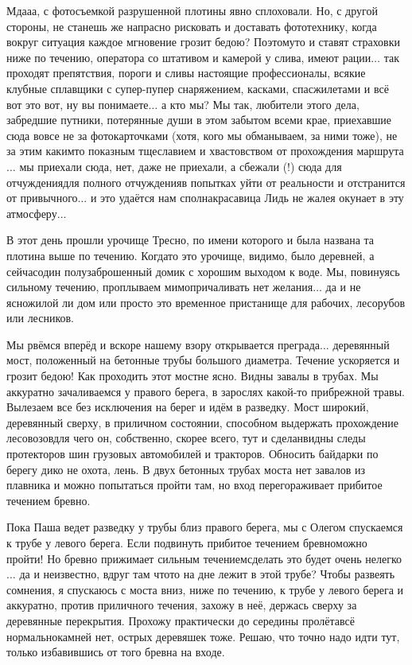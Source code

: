Мда\sdash а\sdash а, с фотосъемкой разрушенной плотины явно сплоховали. Но, с другой стороны, не станешь же напрасно рисковать и доставать фототехнику, когда вокруг ситуация каждое мгновение грозит бедою? Поэтому\sdash то и ставят страховки ниже по течению, оператора со штативом и камерой у слива, имеют рации$\ldots$ так проходят препятствия, пороги и сливы настоящие профессионалы, всякие клубные сплавщики с супер-пупер снаряжением, касками, спасжилетами и всё вот это вот, ну вы понимаете$\ldots$ а кто мы? Мы так, любители этого дела, забредшие путники, потерянные души в этом забытом всеми крае, приехавшие сюда вовсе не за фотокарточками (хотя, кого мы обманываем, за ними тоже), не за этим каким\sdash то показным тщеславием и хвастовством от прохождения маршрута$\ldots$ мы приехали сюда, нет, даже не приехали, а сбежали (!) сюда для отчуждения\mdash для полного отчуждения\mdash в попытках уйти от реальности и отстранится от привычного$\ldots$ и это удаётся нам сполна\mdash красавица Лидь не жалея окунает в эту атмосферу$\ldots$

В этот день прошли урочище Тресно, по имени которого и была названа та плотина выше по течению. Когда\sdash то это урочище, видимо, было деревней, а сейчас\mdash один полузаброшенный домик с хорошим выходом к воде. Мы, повинуясь сильному течению, проплываем мимо\mdash причаливать нет желания$\ldots$ да и не ясно\mdash жилой ли дом или просто это временное пристанище для рабочих, лесорубов или лесников.

Мы рвёмся вперёд и вскоре нашему взору открывается преграда$\ldots$ деревянный мост, положенный на бетонные трубы большого диаметра. Течение ускоряется и грозит бедою! Как проходить этот мост\mdash не ясно. Видны завалы в трубах. Мы аккуратно зачаливаемся у правого берега, в зарослях какой-то прибрежной травы. Вылезаем все без исключения на берег и идём в разведку. Мост широкий, деревянный сверху, в приличном состоянии, способном выдержать прохождение лесовозов\mdash для чего он, собственно, скорее всего, тут и сделан\mdash видны следы протекторов шин грузовых автомобилей и тракторов. Обносить байдарки по берегу дико не охота, лень. В двух бетонных трубах моста нет завалов из плавника и можно попытаться пройти там, но вход перегораживает прибитое течением бревно. 

Пока Паша ведет разведку у трубы близ правого берега, мы с Олегом спускаемся к трубе у левого берега. Если подвинуть прибитое течением бревно\mdash можно пройти! Но бревно прижимает сильным течением\mdash сделать это будет очень нелегко$\ldots$ да и неизвестно, вдруг там что\sdash то на дне лежит в этой трубе? Чтобы развеять сомнения, я спускаюсь с моста вниз, ниже по течению, к трубе у левого берега и аккуратно, против приличного течения, захожу в неё, держась сверху за деревянные перекрытия. Прохожу практически до середины пролёта\mdash всё нормально\mdash камней нет, острых деревяшек тоже. Решаю, что точно надо идти тут, только избавившись от того бревна на входе.

